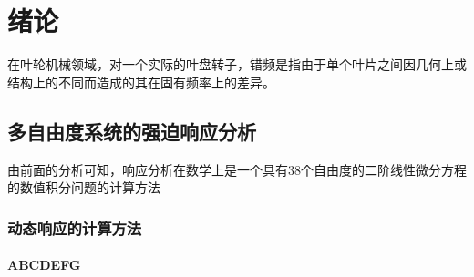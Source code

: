
\chapter{绪论}
在叶轮机械领域，对一个实际的叶盘转子，错频是指由于单个叶片之间因几何上或结构上的不同而造成的其在固有频率上的差异。
\section{多自由度系统的强迫响应分析}
由前面的分析可知，响应分析在数学上是一个具有38个自由度的二阶线性微分方程的数值积分问题的计算方法
\subsection{动态响应的计算方法}

\subsubsection{ABCDEFG}
